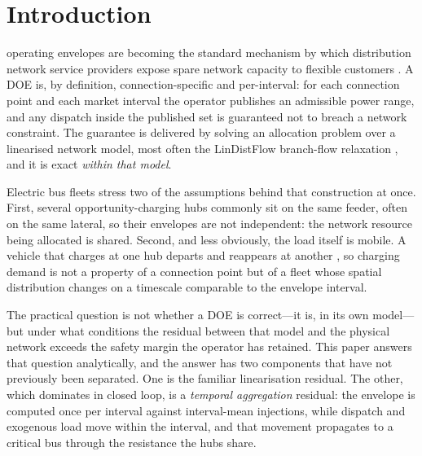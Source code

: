 \documentclass[lettersize,journal]{IEEEtran}
\begin{document}
\section{Introduction}
 operating envelopes are becoming the standard
mechanism by which distribution network service providers expose spare network
capacity to flexible customers \cite{petrou2021dol,liu2024robustdoe}. A DOE is,
by definition, connection-specific and per-interval: for each connection point
and each market interval the operator publishes an admissible power range, and
any dispatch inside the published set is guaranteed not to breach a network
constraint. The guarantee is delivered by solving an allocation problem over a
linearised network model, most often the LinDistFlow branch-flow relaxation
\cite{baran1989reconfig,farivar2013branchI,farivar2013branchII}, and it is exact \emph{within that
model}.

Electric bus fleets stress two of the assumptions behind that construction at
once. First, several opportunity-charging hubs commonly sit on the same feeder,
often on the same lateral, so their envelopes are not independent: the network
resource being allocated is shared. Second, and less obviously, the load itself
is mobile. A vehicle that charges at one hub departs and reappears at another
\cite{abdelwahed2020opportunity}, so charging demand is not a property of a
connection point but of a fleet whose spatial distribution changes on a
timescale comparable to the envelope interval.

The practical question is not whether a DOE is correct---it is, in its own
model---but under what conditions the residual between that model and the
physical network exceeds the safety margin the operator has retained. This
paper answers that question analytically, and the answer has two components
that have not previously been separated. One is the familiar linearisation
residual. The other, which dominates in closed loop, is a \emph{temporal
aggregation} residual: the envelope is computed once per interval against
interval-mean injections, while dispatch and exogenous load move within the
interval, and that movement propagates to a critical bus through the resistance
the hubs share.
\end{document}

